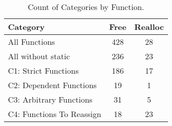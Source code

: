 \begin{table}[H]
   \begin{center}
   \begin{tabularx}{0.6\linewidth}{l|c|c}

      Category & Free & Realloc \\
      \hline

      All Functions& 428 & 28 \\

      All without static& 236 & 23 \\

      C1: Strict Functions& 186 & 17 \\

      C2: Dependent Functions& 19 & 1 \\

      C3: Arbitrary Functions& 31 & 5 \\

      C4: Functions To Reassign& 18 & 23 \\

   \end{tabularx}
\end{center}
   \caption{Count of Categories by Function.}
   \label{tab:categories:overview}
\end{table}

